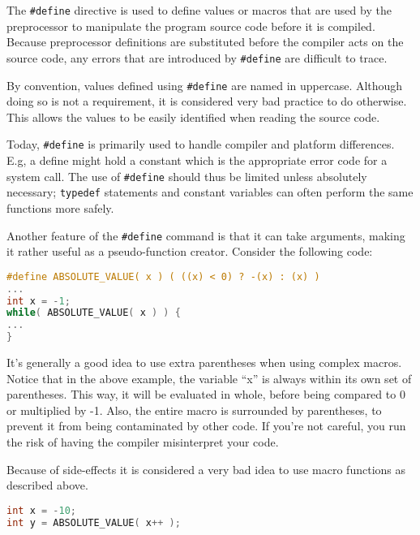The \texttt{\#define} directive is used to define values or macros that are
used by the preprocessor to manipulate the program source code before it is
compiled. Because preprocessor definitions are substituted before the compiler
acts on the source code, any errors that are introduced by \texttt{\#define}
are difficult to trace. 

By convention, values defined using \texttt{\#define} are named in uppercase.
Although doing so is not a requirement, it is considered very bad practice to
do otherwise. This allows the values to be easily identified when reading the
source code.

Today, \texttt{\#define} is primarily used to handle compiler and platform
differences. E.g, a define might hold a constant which is the appropriate error
code for a system call. The use of \texttt{\#define} should thus be limited
unless absolutely necessary; \texttt{typedef} statements and constant variables
can often perform the same functions more safely. 

Another feature of the \texttt{\#define} command is that it can take arguments,
making it rather useful as a pseudo-function creator. Consider the following
code: 
\lstset{basicstyle=\scriptsize, numbers=left, captionpos=b, tabsize=4}
\begin{lstlisting}[caption=Section \thesection listing \arabic{preprocnt},language={C},
breaklines=true,xleftmargin=15pt, label=lst:section\thesection listing\arabic{preprocnt}]
#define ABSOLUTE_VALUE( x ) ( ((x) < 0) ? -(x) : (x) )
...
int x = -1;
while( ABSOLUTE_VALUE( x ) ) {
...
}
\end{lstlisting}
		
It's generally a good idea to use extra parentheses when using complex macros.
Notice that in the above example, the variable ``x'' is always within its own
set of parentheses. This way, it will be evaluated in whole, before being
compared to 0 or multiplied by -1. Also, the entire macro is surrounded by
parentheses, to prevent it from being contaminated by other code. If you're not
careful, you run the risk of having the compiler misinterpret your code.

Because of side-effects it is considered a very bad idea to use macro functions
as described above.
\lstset{basicstyle=\scriptsize, numbers=left, captionpos=b, tabsize=4}
\begin{lstlisting}[caption=Section \thesection listing \arabic{preprocnt},language={C},
breaklines=true,xleftmargin=15pt, label=lst:section\thesection listing\arabic{preprocnt}]
int x = -10;
int y = ABSOLUTE_VALUE( x++ );
\end{lstlisting}

